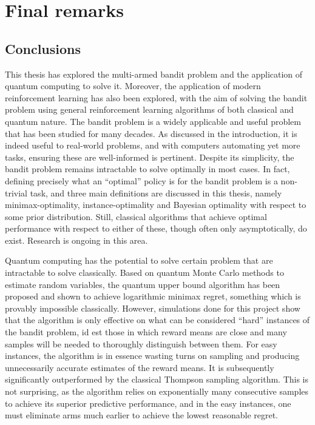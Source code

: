 \chapter{Final remarks}
\label{chap:final}

\section{Conclusions}
This thesis has explored the multi-armed bandit problem and the application of quantum computing to solve it.
Moreover, the application of modern reinforcement learning has also been explored, with the aim of solving the bandit problem using general reinforcement learning algorithms of both classical and quantum nature.
The bandit problem is a widely applicable and useful problem that has been studied for many decades.
As discussed in the introduction, it is indeed useful to real-world problems, and with computers automating yet more tasks, ensuring these are well-informed is pertinent.
Despite its simplicity, the bandit problem remains intractable to solve optimally in most cases.
In fact, defining precisely what an \enquote{optimal} policy is for the bandit problem is a non-trivial task, and three main definitions are discussed in this thesis, namely minimax-optimality, instance-optimality and Bayesian optimality with respect to some prior distribution.
Still, classical algorithms that achieve optimal performance with respect to either of these, though often only asymptotically, do exist.
Research is ongoing in this area.

Quantum computing has the potential to solve certain problem that are intractable to solve classically.
Based on quantum Monte Carlo methods to estimate random variables, the quantum upper bound algorithm has been proposed and shown to achieve logarithmic minimax regret, something which is provably impossible classically.
However, simulations done for this project show that the algorithm is only effective on what can be considered \enquote{hard} instances of the bandit problem, id est those in which reward means are close and many samples will be needed to thoroughly distinguish between them.
For easy instances, the algorithm is in essence wasting turns on sampling and producing unnecessarily accurate estimates of the reward means.
It is subsequently significantly outperformed by the classical Thompson sampling algorithm.
This is not surprising, as the algorithm relies on exponentially many consecutive samples to achieve its superior predictive performance, and in the easy instances, one must eliminate arms much earlier to achieve the lowest reasonable regret.


